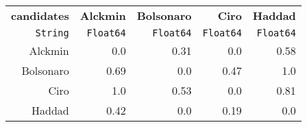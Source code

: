 \begin{table}
  \begin{tabular}{rrrrr}
    \hline\hline
    \textbf{candidates} & \textbf{Alckmin} & \textbf{Bolsonaro} & \textbf{Ciro} & \textbf{Haddad} \\
    \texttt{String} & \texttt{Float64} & \texttt{Float64} & \texttt{Float64} & \texttt{Float64} \\\hline
    Alckmin & 0.0 & 0.31 & 0.0 & 0.58 \\
    Bolsonaro & 0.69 & 0.0 & 0.47 & 1.0 \\
    Ciro & 1.0 & 0.53 & 0.0 & 0.81 \\
    Haddad & 0.42 & 0.0 & 0.19 & 0.0 \\\hline\hline
  \end{tabular}
\end{table}
